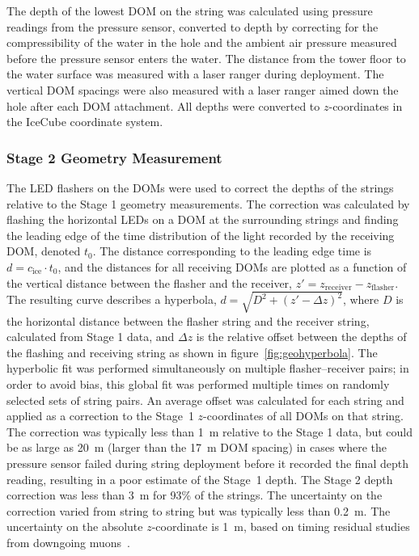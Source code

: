 The depth of the lowest DOM on the string was calculated using pressure
readings from the pressure sensor, converted to depth by correcting for the
compressibility of the water in the hole and the ambient air pressure
measured before the pressure sensor enters the water. The distance from the
tower floor to the water surface was measured with a laser ranger
during deployment. The
vertical DOM spacings were also measured with a laser
ranger aimed down the hole after each DOM attachment. All depths were
converted to $z$-coordinates in the IceCube 
coordinate system.

\subsubsection{\label{subsec:stage2_geo}Stage 2 Geometry Measurement}

The LED flashers on the DOMs were used to correct the depths of the strings relative to
the Stage 1 geometry measurements. The correction was calculated by flashing
the horizontal LEDs on a DOM at the surrounding strings and finding the
leading edge of the time distribution of the light recorded by the
receiving DOM, denoted $t_0$. The distance corresponding to the leading
edge time is $d = c_{\mathrm{ice}} \cdot t_0$, and the distances for all receiving
DOMs are plotted as a function of the vertical distance between the flasher
and the receiver, $z' = z_{\mathrm{receiver}} - z_{\mathrm{flasher}}$. The resulting curve
describes a hyperbola, $d = \sqrt{D^2 + (z' -\Delta z)^2}$, where $D$ is
the horizontal distance between the flasher string and the receiver string,
calculated from Stage 1 data, and $\Delta z$ is the relative offset between
the depths of the flashing and receiving string as shown in
figure~\ref{fig:geohyperbola}. The hyperbolic fit was performed
simultaneously on multiple flasher--receiver pairs; in order to avoid
bias, this global fit was performed multiple times on randomly
selected sets of string pairs. An average offset was calculated for
each string and applied as a correction to the Stage~1 $z$-coordinates
of all DOMs on that string. The correction was typically less than 1~m
relative to the Stage 1 data, but could be as large as 20~m (larger than the
17~m DOM spacing) in cases where the pressure sensor failed during string
deployment before it recorded the final depth reading, resulting in a
poor estimate of the Stage~1 depth. The Stage 2 depth correction was less than 3~m for 93\%
of the strings. The uncertainty on the correction varied from string
to string but was typically less than 0.2~m. The uncertainty on the
absolute $z$-coordinate is 1~m, based on timing residual studies from
downgoing muons~\cite{IC3:perf}.

